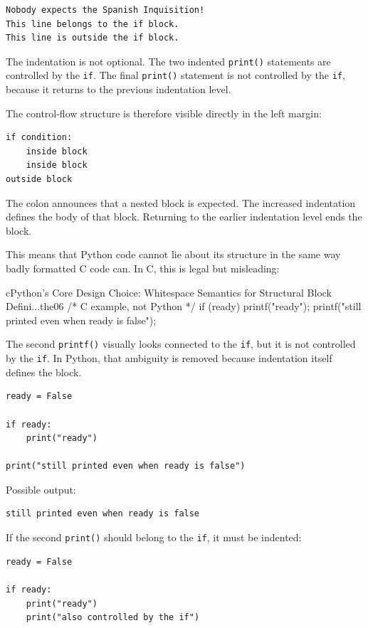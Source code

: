 \begin{verbatim}
Nobody expects the Spanish Inquisition!
This line belongs to the if block.
This line is outside the if block.
\end{verbatim}

The indentation is not optional. The two indented \texttt{print()} statements are controlled by the \texttt{if}. The final \texttt{print()} statement is not controlled by the \texttt{if}, because it returns to the previous indentation level.

The control-flow structure is therefore visible directly in the left margin:

\begin{verbatim}
if condition:
    inside block
    inside block
outside block
\end{verbatim}

The colon announces that a nested block is expected. The increased indentation defines the body of that block. Returning to the earlier indentation level ends the block.

This means that Python code cannot lie about its structure in the same way badly formatted C code can. In C, this is legal but misleading:

\begin{codebox}[]{c}{Python’s Core Design Choice: Whitespace Semantics for Structural Block Defini...}{the06}
/* C example, not Python */
if (ready)
    printf("ready\n");
    printf("still printed even when ready is false\n");
\end{codebox}


The second \texttt{printf()} visually looks connected to the \texttt{if}, but it is not controlled by the \texttt{if}. In Python, that ambiguity is removed because indentation itself defines the block.

\begin{verbatim}
ready = False

if ready:
    print("ready")

print("still printed even when ready is false")
\end{verbatim}

Possible output:

\begin{verbatim}
still printed even when ready is false
\end{verbatim}

If the second \texttt{print()} should belong to the \texttt{if}, it must be indented:

\begin{verbatim}
ready = False

if ready:
    print("ready")
    print("also controlled by the if")
\end{verbatim}


